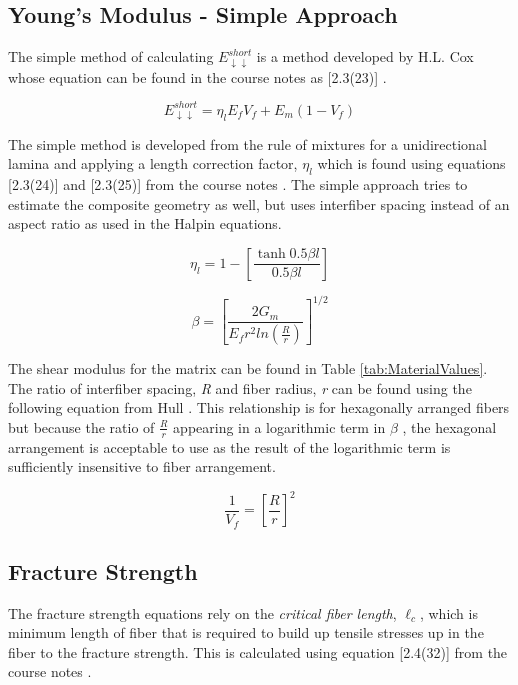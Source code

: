 \documentclass[11pt]{article}
\begin{document}
\subsection{Young's Modulus - Simple Approach}

The simple method of calculating \(E_{\downarrow \downarrow}^{short}\) is a method developed by H.L. Cox whose equation can be found in the course notes as [2.3(23)] \cite{course_notes}.

\begin{equation} \label{eq:simple}
E^{short}_{\downarrow \downarrow} = \eta_l E_f V_f + E_m(1-V_f)
\end{equation}

The simple method is developed from the rule of mixtures for a unidirectional lamina and applying a length correction factor, \(\eta_l\) which is found using equations [2.3(24)] and [2.3(25)] from the course notes \cite{course_notes}. The simple approach tries to estimate the composite geometry as well, but uses interfiber spacing instead of an aspect ratio as used in the Halpin equations.

\begin{equation}
\eta_l = 1- \left[\frac{\tanh 0.5\beta l}{0.5\beta l} \right]
\end{equation}

\begin{equation}
\beta=\left[\frac{2G_m}{E_fr^2 ln(\frac{R}{r})}\right]^{1/2}
\end{equation}

The shear modulus for the matrix can be found in Table \ref{tab:MaterialValues}. The ratio of interfiber spacing, \textit{R} and fiber radius, \textit{r} can be found using the following equation from Hull \cite{hull}. This relationship is for hexagonally arranged fibers but because the ratio of \(\frac{R}{r}\) appearing in a logarithmic term in \(\beta\) , the hexagonal arrangement is acceptable to use as the result of the logarithmic term is sufficiently insensitive to fiber arrangement.

\begin{equation}
\frac{1}{V_f}=\left[\frac{R}{r}\right]^2
\end{equation}

\subsection{Fracture Strength}

The fracture strength equations rely on the \textit{critical fiber length}, \(\ell_c\), which is minimum length of fiber that is required to build up tensile stresses up in the fiber to the fracture strength. This is calculated using equation [2.4(32)] from the course notes \cite{course_notes}.
\end{document}
